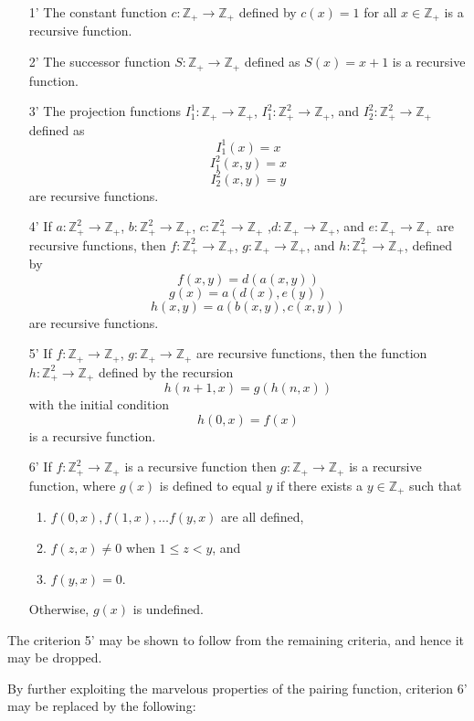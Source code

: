 \documentclass[12pt]{article}
\begin{document}
\begin{enumerate}
\item[1'] The constant function $c: \mathbb{Z}_+ \to \mathbb{Z}_+$ defined by $c(x) = 1$ for all $x \in \mathbb{Z}_+$ is a recursive function.
\item[2']  The successor function $S \colon \mathbb{Z}_+ \to \mathbb{Z}_+$ defined as $S(x) = x+1$ is a recursive function.
\item[3'] The projection functions $I^1_1 \colon \mathbb{Z}_+ \to \mathbb{Z}_+$, $I^2_1 \colon \mathbb{Z}_+^2 \to \mathbb{Z}_+$, and $I^2_2 \colon \mathbb{Z}_+^2 \to \mathbb{Z}_+$ defined as
 $$I^1_1 (x) = x$$ 
 $$I^2_1 (x,y) = x$$ 
 $$I^2_2 (x,y) = y$$ 
are recursive functions.
\item[4'] If $a \colon \mathbb{Z}_+^2 \to \mathbb{Z}_+$, $b \colon \mathbb{Z}_+^2 \to \mathbb{Z}_+$, $c \colon \mathbb{Z}_+^2 \to \mathbb{Z}_+$ ,$d \colon \mathbb{Z}_+ \to \mathbb{Z}_+$, and $e \colon \mathbb{Z}_+ \to \mathbb{Z}_+$ are recursive functions, then $f \colon \mathbb{Z}_+^2 \to \mathbb{Z}_+$, $g \colon \mathbb{Z}_+ \to \mathbb{Z}_+$, and $h \colon \mathbb{Z}_+^2 \to \mathbb{Z}_+$, defined by
 $$f(x,y) = d(a(x,y))$$
 $$g(x) = a(d(x),e(y))$$
 $$h(x,y) = a(b(x,y),c(x,y))$$
are recursive functions.
\item[5'] If $f \colon \mathbb{Z}_+ \to \mathbb{Z}_+$, $g \colon \mathbb{Z}_+ \to \mathbb{Z}_+$ are recursive functions, then the function $h \colon \mathbb{Z}_+^2 \to \mathbb{Z}_+$ defined by the recursion
 $$h(n+1,x) = g(h(n,x))$$
with the initial condition
 $$h(0,x) = f(x)$$
is a recursive function.
\item[6'] If $f \colon \mathbb{Z}_+^2 \to \mathbb{Z}_+$ is a recursive function then $g \colon \mathbb{Z}_+ \to \mathbb{Z}_+$ is a recursive function, where $g(x)$ is defined to equal $y$ if there exists a $y \in \mathbb{Z}_+$ such that 
\begin{enumerate}
\item $f(0, x), f(1, x), \ldots f(y, x)$ are all defined, 
\item $f(z, x) \ne 0$ when $1 \le z <y$, and 
\item $f(y, x) = 0$.
\end{enumerate}
Otherwise, $g(x)$ is undefined.
\end{enumerate}

The criterion 5' may be shown to follow from the remaining criteria, and hence it may be dropped.

By further exploiting the marvelous properties of the pairing function, criterion 6' may be replaced by the following:
\end{document}
